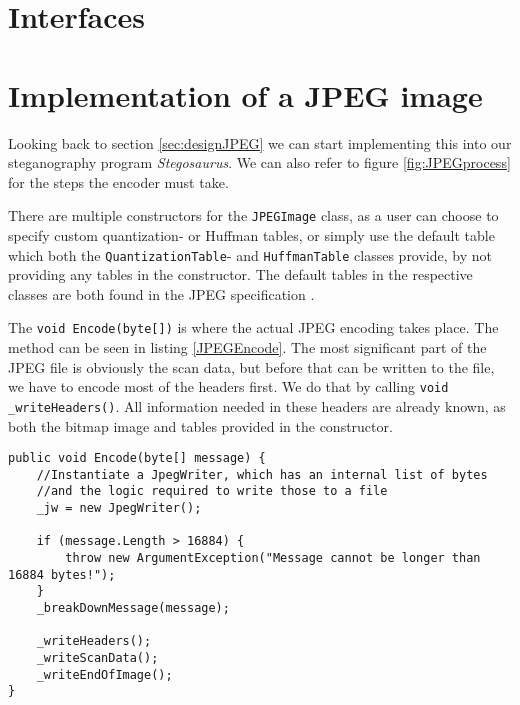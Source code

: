 \section{Interfaces}
\section{Implementation of a JPEG image}
Looking back to section \ref{sec:designJPEG} we can start implementing this into our steganography program \textit{Stegosaurus}.
We can also refer to figure \ref{fig:JPEGprocess} for the steps the encoder must take.

There are multiple constructors for the \lstinline|JPEGImage| class, as a user can choose to specify custom quantization- or Huffman tables, or simply use the default table which both the \lstinline|QuantizationTable|- and \lstinline|HuffmanTable| classes provide, by not providing any tables in the constructor.
The default tables in the respective classes are both found in the JPEG specification \citep[Annex k]{JPEGStandard}.

The \lstinline|void Encode(byte[])| is where the actual JPEG encoding takes place.
The method can be seen in listing \ref{JPEGEncode}.
The most significant part of the JPEG file is obviously the scan data, but before that can be written to the file, we have to encode most of the headers first.
We do that by calling \lstinline|void _writeHeaders()|.
All information needed in these headers are already known, as both the bitmap image and tables provided in the constructor.

\begin{lstlisting}[firstnumber=136,label=JPEGEncode, caption={\lstinline|JPEGImage.Encode| method \textbf{File: }JPEGImage.cs}]
public void Encode(byte[] message) {
    //Instantiate a JpegWriter, which has an internal list of bytes 
    //and the logic required to write those to a file
    _jw = new JpegWriter();

    if (message.Length > 16884) {
        throw new ArgumentException("Message cannot be longer than 16884 bytes!");
    }
    _breakDownMessage(message);

    _writeHeaders();
    _writeScanData();
    _writeEndOfImage();
}
\end{lstlisting}

